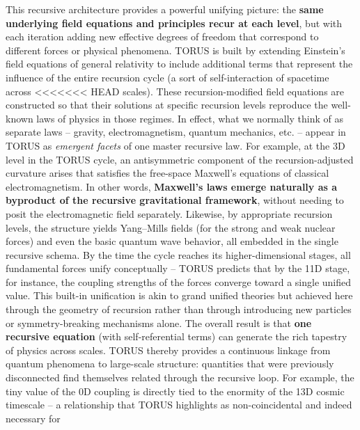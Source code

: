 \documentclass[]{article}
\begin{document}
This recursive architecture provides a powerful unifying picture: the
\textbf{same underlying field equations and principles recur at each
level}, but with each iteration adding new effective degrees of freedom
that correspond to different forces or physical phenomena. TORUS is
built by extending Einstein's field equations of general relativity to
include additional terms that represent the influence of the entire
recursion cycle (a sort of self-interaction of spacetime across
<<<<<<< HEAD
scales)\hspace{0pt}. These recursion-modified field equations are
constructed so that their solutions at specific recursion levels
reproduce the well-known laws of physics in those regimes. In effect,
what we normally think of as separate laws -- gravity, electromagnetism,
quantum mechanics, etc. -- appear in TORUS as \emph{emergent facets} of
one master recursive law. For example, at the 3D level in the TORUS
cycle, an antisymmetric component of the recursion-adjusted curvature
arises that satisfies the free-space Maxwell's equations of classical
electromagnetism\hspace{0pt}. In other words, \textbf{Maxwell's laws
emerge naturally as a byproduct of the recursive gravitational
framework}, without needing to posit the electromagnetic field
separately\hspace{0pt}. Likewise, by appropriate recursion levels, the
structure yields Yang--Mills fields (for the strong and weak nuclear
forces) and even the basic quantum wave behavior, all embedded in the
single recursive schema. By the time the cycle reaches its
higher-dimensional stages, all fundamental forces unify conceptually --
TORUS predicts that by the 11D stage, for instance, the coupling
strengths of the forces converge toward a single unified
value\hspace{0pt}. This built-in unification is akin to grand unified
theories but achieved here through the geometry of recursion rather than
through introducing new particles or symmetry-breaking mechanisms alone.
The overall result is that \textbf{one recursive equation} (with
self-referential terms) can generate the rich tapestry of physics across
scales. TORUS thereby provides a continuous linkage from quantum
phenomena to large-scale structure: quantities that were previously
disconnected find themselves related through the recursive loop. For
example, the tiny value of the 0D coupling \alpha is directly tied to the
enormity of the 13D cosmic timescale -- a relationship that TORUS
highlights as non-coincidental and indeed necessary for
\end{document}
